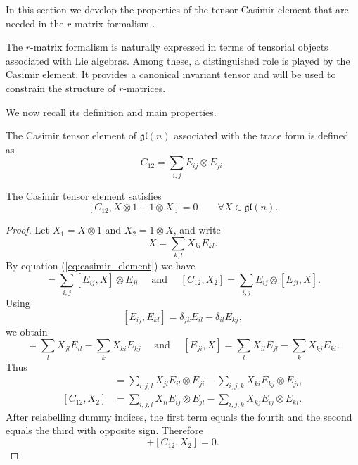 In this section we develop the properties of the tensor Casimir element that are needed in the $r$-matrix formalism \cite{perelomov1990integrable,babelon2003introduction}.

The $r$-matrix formalism is naturally expressed in terms of tensorial objects associated with Lie algebras. Among these, a distinguished role is played by the Casimir element. It provides a canonical invariant tensor and will be used to constrain the structure of $r$-matrices.

We now recall its definition and main properties.

\begin{definition}
    The Casimir tensor element of $\mathfrak{gl}(n)$ associated with the trace form is defined as
    \begin{equation}\label{eq:casimir_element}
        C_{12} = \sum_{i,j} E_{ij} \otimes E_{ji}.
    \end{equation}
\end{definition}
\begin{proposition}\label{prop:casimir_invariant}
    The Casimir tensor element satisfies
    \begin{equation}\label{eq:casimir_property}
        [C_{12}, X \otimes 1 + 1 \otimes X] = 0
        \qquad \forall X \in \mathfrak{gl}(n).
    \end{equation}
\end{proposition}

\begin{proof}
Let $X_1=X\otimes1$ and $X_2=1\otimes X$, and write
\begin{equation}
    X=\sum_{k,l}X_{kl}E_{kl}.
\end{equation}
By equation (\ref{eq:casimir_element}) we have
\begin{equation}
    [C_{12},X_1]
    =\sum_{i,j}[E_{ij},X]\otimes E_{ji} \quad \text{ and } \quad [C_{12},X_2]
    =\sum_{i,j}E_{ij}\otimes[E_{ji},X].
\end{equation}
Using
\begin{equation}\label{eq:[E_ij,E_kl]}
    [E_{ij},E_{kl}]
    =\delta_{jk}E_{il}-\delta_{il}E_{kj},
\end{equation}
we obtain
\begin{equation}
    [E_{ij},X]
    =\sum_l X_{jl}E_{il}-\sum_k X_{ki}E_{kj} \quad \text{ and } \quad 
    [E_{ji},X]
    =\sum_l X_{il}E_{jl}-\sum_k X_{kj}E_{ki}.
\end{equation}
Thus
\begin{align}
[C_{12},X_1]
    &=\sum_{i,j,l}X_{jl}E_{il}\otimes E_{ji}
    -\sum_{i,j,k}X_{ki}E_{kj}\otimes E_{ji}, \\
    [C_{12},X_2]
    &=\sum_{i,j,l}X_{il}E_{ij}\otimes E_{jl}
    -\sum_{i,j,k}X_{kj}E_{ij}\otimes E_{ki}.
\end{align}
After relabelling dummy indices, the first term equals the fourth and the second equals the third with opposite sign. Therefore
\begin{equation}
    [C_{12},X_1]+[C_{12},X_2]=0.
\end{equation}
\end{proof}

